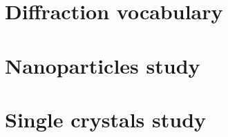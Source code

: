 \documentclass[11pt]{report}
\begin{document}
%     
    
    \printbibliography

    \appendix

    \chapter{Diffraction vocabulary}
    

    \chapter{Nanoparticles study}
    

    \chapter{Single crystals study}
    
    


\end{document}
